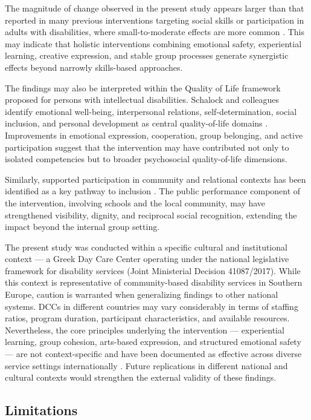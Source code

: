 \documentclass[journal]{IEEEtran}
\begin{document}
The magnitude of change observed in the present study appears larger than that reported in many previous interventions targeting social skills or participation in adults with disabilities, where small-to-moderate effects are more common \cite{hall2009,verdonschot2009}. This may indicate that holistic interventions combining emotional safety, experiential learning, creative expression, and stable group processes generate synergistic effects beyond narrowly skills-based approaches.

The findings may also be interpreted within the Quality of Life framework proposed for persons with intellectual disabilities. Schalock and colleagues identify emotional well-being, interpersonal relations, self-determination, social inclusion, and personal development as central quality-of-life domains \cite{schalock2010}. Improvements in emotional expression, cooperation, group belonging, and active participation suggest that the intervention may have contributed not only to isolated competencies but to broader psychosocial quality-of-life dimensions.

Similarly, supported participation in community and relational contexts has been identified as a key pathway to inclusion \cite{bigby2015}. The public performance component of the intervention, involving schools and the local community, may have strengthened visibility, dignity, and reciprocal social recognition, extending the impact beyond the internal group setting.

The present study was conducted within a specific cultural and
institutional context --- a Greek Day Care Center operating under
the national legislative framework for disability services (Joint
Ministerial Decision 41087/2017). While this context is
representative of community-based disability services in Southern
Europe, caution is warranted when generalizing findings to other
national systems. DCCs in different countries may vary considerably
in terms of staffing ratios, program duration, participant
characteristics, and available resources. Nevertheless, the core
principles underlying the intervention --- experiential learning,
group cohesion, arts-based expression, and structured emotional
safety --- are not context-specific and have been documented as
effective across diverse service settings internationally
\cite{giummarra2022,leavy2015}. Future replications in different
national and cultural contexts would strengthen the external
validity of these findings.

\subsection{Limitations}
\end{document}
